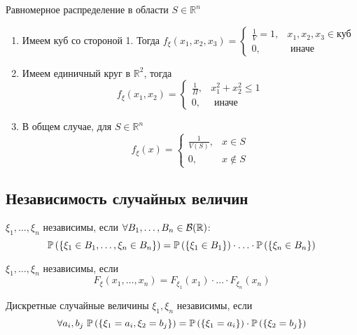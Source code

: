 \documentclass[a4paper, 10pt]{article}
\begin{document}
\ex Равномерное распределение в области $S\in\mathbb{R}^n$
\begin{enumerate}
    \item Имеем куб со стороной 1. Тогда $f_{\xi}(x_1,x_2,x_3)=\begin{cases}
        \frac{1}{V}=1,& x_1,x_2,x_3\in\text{куб}\\
        0,&\text{ иначе}
    \end{cases}$
    \item Имеем единичный круг в $\mathbb{R}^2$, тогда 
    \begin{equation*}
        f_{\xi}(x_1,x_2)=\begin{cases}
            \frac{1}{\Pi},&x_1^2+x_2^2\leqslant 1\\
            0,&\text{ иначе}
        \end{cases}
    \end{equation*}
    \item В общем случае, для $S\in\mathbb{R}^n$
    \begin{equation*}
        f_{\xi}(x)=\begin{cases}
            \frac{1}{V(S)}, & x\in S\\
            0,& x\not\in S
        \end{cases}
    \end{equation*}
\end{enumerate}

\subsection{Независимость случайных величин}
 $\xi_1,\ldots,\xi_n$ независимы, если $\forall B_1,\ldots,B_n\in\mathcal{B}(\mathbb{R})$:
\begin{equation*}
    \mathbb{P}\left(\{\xi_1\in B_1,\ldots,\xi_n\in B_n\}\right)=\mathbb{P}\left(\{\xi_1\in B_1\}\right)\cdot\ldots\cdot\mathbb{P}\left(\{\xi_n\in B_n\}\right)
\end{equation*}

 $\xi_1,\ldots,\xi_n$ независимы, если
\begin{equation*}
    F_{\xi}(x_1,\ldots,x_n)=F_{\xi_1}(x_1)\cdot\ldots\cdot F_{\xi_n}(x_n)
\end{equation*}

 Дискретные случайные величины $\xi_1,\xi_n$ независимы, если 
\begin{equation*}
    \forall a_i,b_j\ \prob{\xi_1=a_i,\xi_2=b_j}=\prob{\xi_1=a_i}\cdot\prob{\xi_2=b_j}
\end{equation*}
\end{document}
